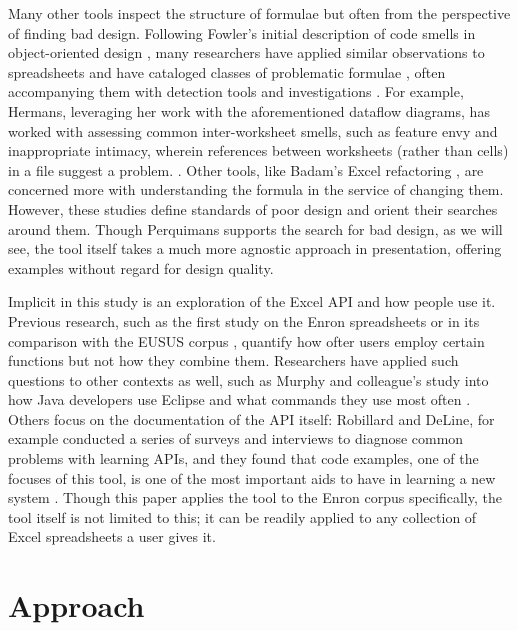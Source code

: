 \documentclass[conference]{IEEEtran}
\newcommand{\toolname}{Perquimans }
\begin{document}
	Many other tools inspect the structure of formulae but often from the
	perspective of finding bad design.  Following Fowler's initial description of
	code smells in object-oriented design \cite{fowler2009refactoring}, many
	researchers have applied similar observations to spreadsheets and have
	cataloged classes of problematic formulae \cite{hermans2012detecting}
	\cite{cunha2012towards} \cite{asavametha2012detecting}, often accompanying them
	with detection tools \cite{abreu2014smelling} and investigations
	\cite{jansen2015code}. For example, Hermans, leveraging her work with the
	aforementioned dataflow diagrams, has worked with assessing common
	inter-worksheet smells, such as feature envy and inappropriate intimacy,
	wherein references between worksheets (rather than cells) in a file suggest a
	problem. \cite{hermans2012detectinginter}. Other tools, like Badam's Excel
	refactoring \cite{badame2012refactoring}, are concerned more with understanding
	the formula in the service of changing them. However, these studies define
	standards of poor design and orient their searches around them. Though
	\toolname supports the search for bad design, as we will see, the tool itself
	takes a much more agnostic approach in presentation, offering examples without
	regard for design quality. \par
	
	Implicit in this study is an exploration of the Excel API and how people use
	it. Previous research, such as the first study on the Enron spreadsheets
	\cite{hermans2015enron} or in its comparison with the EUSUS corpus
	\cite{jansen2015enron}, quantify how ofter users employ certain functions but
	not how they combine them. Researchers have applied such questions to other
	contexts as well, such as Murphy and colleague's study into how Java developers
	use Eclipse and what commands they use most often \cite{murphy2006java}. Others
	focus on the documentation of the API itself: Robillard and DeLine, for example
	conducted a series of surveys and interviews to diagnose common problems with
	learning APIs, and they found that code examples, one of the focuses of this
	tool, is one of the most important aids to have in learning a new system
	\cite{robillard2011field}. Though this paper applies the tool to the Enron
	corpus specifically, the tool itself is not limited to this; it can be readily
	applied to any collection of Excel spreadsheets a user gives it.
	
	\section{Approach}
	
\end{document}
